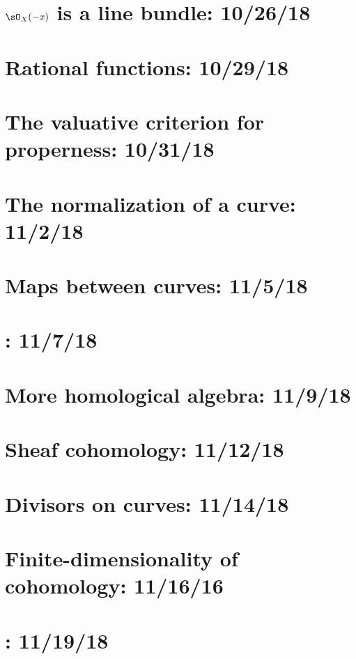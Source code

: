 \documentclass{notes_d}
\begin{document}
\section{$\sO_X(-x)$ is a line bundle: 10/26/18}
	
\section{Rational functions: 10/29/18}
	
\section{The valuative criterion for properness: 10/31/18}
	
\section{The normalization of a curve: 11/2/18}
	
\section{Maps between curves: 11/5/18}
	
\section{: 11/7/18}
\section{More homological algebra: 11/9/18}
	
\section{Sheaf cohomology: 11/12/18}
	
\section{Divisors on curves: 11/14/18}
	
\section{Finite-dimensionality of cohomology: 11/16/16}
	
\section{: 11/19/18}
\end{document}
